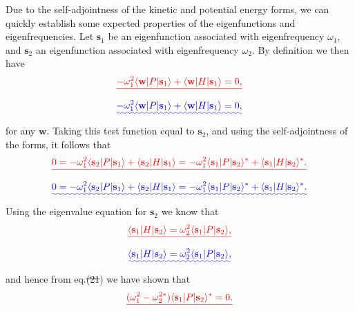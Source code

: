 \documentclass[a4paper,12pt]{paper}
\providecommand{\DIFadd}[1]{{\protect\color{blue}\uwave{#1}}} %
\providecommand{\DIFdel}[1]{{\protect\color{red}\sout{#1}}}                      %
\providecommand{\DIFaddbegin}{} %
\providecommand{\DIFaddend}{} %
\providecommand{\DIFdelbegin}{} %
\providecommand{\DIFdelend}{} %
\begin{document}
Due to the self-adjointness of the kinetic and potential energy forms, we can quickly establish some expected properties of the
 eigenfunctions and eigenfrequencies. Let $\mathbf{s}_{1}$ be an eigenfunction associated with eigenfrequency $\omega_{1}$,
  and $\mathbf{s}_{2}$ an eigenfunction associated with eigenfrequency $\omega_{2}$. By definition we then have
\DIFdelbegin \begin{displaymath}
\DIFdel{-\omega_{1}^{2}\langle \mathbf{w}|P|\mathbf{s}_{1}\rangle+\langle \mathbf{w}|H|\mathbf{s}_{1}\rangle=0,
}\end{displaymath}%
\DIFdelend \DIFaddbegin \begin{equation}
\DIFadd{-\omega_{1}^{2}\langle \mathbf{w}|P|\mathbf{s}_{1}\rangle+\langle \mathbf{w}|H|\mathbf{s}_{1}\rangle=0,
\label{eq:20}
}\end{equation}\DIFaddend 
for any $\mathbf{w}$. Taking this test function equal to $\mathbf{s}_{2}$, and using the self-adjointness of the forms, it follows that
\DIFdelbegin \begin{displaymath}
\DIFdel{0=-\omega_{1}^{2}\langle \mathbf{s}_{2}|P|\mathbf{s}_{1}\rangle+\langle \mathbf{s}_{2}|H|\mathbf{s}_{1}\rangle=
-\omega_{1}^{2}\langle \mathbf{s}_{1}|P|\mathbf{s}_{2}\rangle^{*}+\langle \mathbf{s}_{1}|H|\mathbf{s}_{2}\rangle^{*}.
}\end{displaymath}%
\DIFdelend \DIFaddbegin \begin{equation}
\DIFadd{0=-\omega_{1}^{2}\langle \mathbf{s}_{2}|P|\mathbf{s}_{1}\rangle+\langle \mathbf{s}_{2}|H|\mathbf{s}_{1}\rangle=
-\omega_{1}^{2}\langle \mathbf{s}_{1}|P|\mathbf{s}_{2}\rangle^{*}+\langle \mathbf{s}_{1}|H|\mathbf{s}_{2}\rangle^{*}.
\label{eq:21}
}\end{equation}\DIFaddend 
Using the eigenvalue equation for $\mathbf{s}_{2}$ we know that
\DIFdelbegin \begin{displaymath}
\DIFdel{\langle \mathbf{s}_{1}|H|\mathbf{s}_{2}\rangle=\omega_{2}^{2}\langle \mathbf{s}_{1}|P|\mathbf{s}_{2}\rangle,
}\end{displaymath}%
\DIFdelend \DIFaddbegin \begin{equation}
\DIFadd{\langle \mathbf{s}_{1}|H|\mathbf{s}_{2}\rangle=\omega_{2}^{2}\langle \mathbf{s}_{1}|P|\mathbf{s}_{2}\rangle,
\label{eq:22}
}\end{equation}\DIFaddend 
and hence from eq.\DIFdelbegin \DIFdel{(21}\DIFdelend \DIFaddbegin \DIFadd{~(\ref{eq:21}}\DIFaddend ) we have shown that
\DIFdelbegin \begin{displaymath}
\DIFdel{(\omega_{1}^{2}-\omega_{2}^{2*})\langle \mathbf{s}_{1}|P|\mathbf{s}_{2}\rangle^{*}=0 .
}\end{displaymath}%
\end{document}
